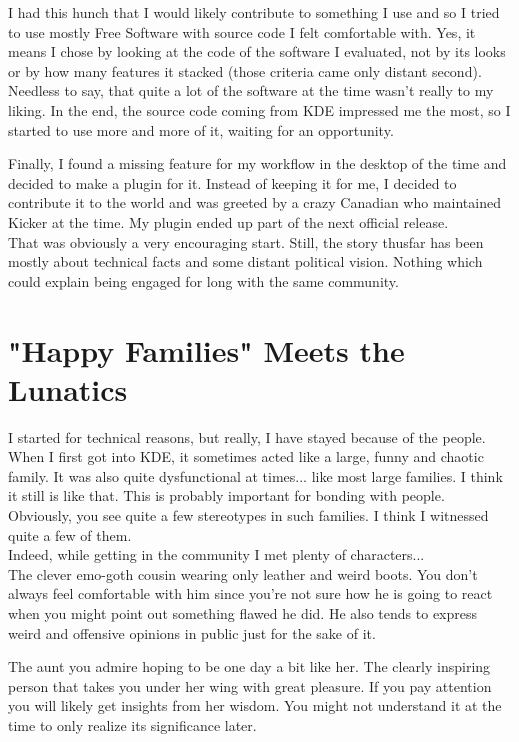 I had this hunch that I would likely contribute to something I use and so I
tried to use mostly Free Software with source code I felt comfortable with.
Yes, it means I chose by looking at the code of the software I evaluated, not
by its looks or by how many features it stacked (those criteria came only
distant second). Needless to say, that quite a lot of the software at the time
wasn't really to my liking. In the end, the source code coming from KDE
impressed me the most, so I started to use more and more of it, waiting for an
opportunity.

Finally, I found a missing feature for my workflow in the desktop of the time
and decided to make a plugin for it. Instead of keeping it for me, I decided to
contribute it to the world and was greeted by a crazy Canadian who maintained
Kicker at the time. My plugin ended up part of the next official release. \\

That was obviously a very encouraging start. Still, the story thusfar has been  mostly about
technical facts and some distant political vision. Nothing which could explain
being engaged for long with the same community.

\section*{"Happy Families" Meets the Lunatics}
I started for technical reasons, but really, I have stayed because of the people.
When I first got into KDE, it sometimes acted like a large, funny and chaotic family.
It was also quite dysfunctional at times... like most large families. I think it
still is like that. This is probably important for bonding with people. Obviously,
you see quite a few stereotypes in such families. I think I witnessed quite a
few of them. \\

Indeed, while getting in the community I met plenty of characters... \\

The clever emo-goth cousin wearing only leather and weird boots. You don't
always feel comfortable with him since you're not sure how he is going to react
when you might point out something flawed he did. He also tends to express
weird and offensive opinions in public just for the sake of it.

The aunt you admire hoping to be one day a bit like her. The clearly inspiring
person that takes you under her wing with great pleasure. If you pay attention
you will likely get insights from her wisdom. You might not understand it at
the time to only realize its significance later.

